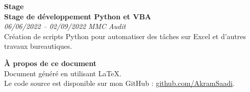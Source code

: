 \documentclass[a4paper,11pt]{article} %
\newcommand{\cvsection}[1]{\vspace{1em}\noindent\textbf{\textcolor{cvhighlight}{\LARGE #1}}\vspace{0.5em}\\}
\newcommand{\cvevent}[3]{\textbf{#1} \\ \textit{#2} \hfill \textit{#3} \vspace{0.5em}}
\begin{document}
\begin{paracol}{2}
\colorbox{sectionbg1}{
    \parbox{\linewidth}{
        \cvsection{\faLaptopCode \hspace{0.5em} Stage}
        \cvevent{Stage de développement Python et VBA}{06/06/2022 – 02/09/2022}{MMC Audit} \\
        Création de scripts Python pour automatiser des tâches sur Excel et d'autres travaux bureautiques.
    }
}
\medskip

\colorbox{sectionbg2}{
    \parbox{\linewidth}{
        \cvsection{\faFileCode \hspace{0.5em} À propos de ce document}
        Document généré en utilisant \LaTeX. \\
        Le code source est disponible sur mon GitHub : \href{https://github.com/AkramSaadi}{github.com/AkramSaadi}.
    }
}

\end{paracol}
\end{document}

